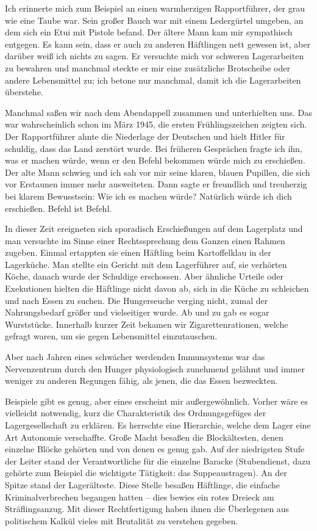 Ich erinnerte mich zum Beispiel an einen warmherzigen Rapportführer, der grau wie eine Taube war.  Sein großer Bauch war mit einem Ledergürtel umgeben, an dem sich ein Etui mit Pistole befand. Der ältere Mann kam mir sympathisch entgegen. Es kann sein, dass er auch zu anderen Häftlingen nett gewesen ist, aber darüber weiß ich nichts zu sagen. Er versuchte mich vor schweren Lagerarbeiten zu bewahren und manchmal steckte er mir eine zusätzliche Brotscheibe oder andere Lebensmittel zu; ich betone nur manchmal, damit ich die Lagerarbeiten überstehe.

Manchmal saßen wir nach dem Abendappell zusammen und unterhielten uns. 
Das war wahrscheinlich schon im März 1945, die ersten Frühlingszeichen zeigten sich. Der Rapportführer ahnte die Niederlage der Deutschen und hielt Hitler für schuldig, dass das Land zerstört wurde. Bei früheren Gesprächen fragte ich ihn, was er machen würde, wenn er den Befehl bekommen würde mich zu erschießen.
Der alte Mann schwieg und ich sah vor mir seine klaren, blauen Pupillen, die sich vor Erstaunen immer mehr ausweiteten. Dann sagte er freundlich und treuherzig bei klarem Bewusstsein: \glqq Wie ich es machen würde? Natürlich würde ich dich erschießen. Befehl ist Befehl.\grqq

In dieser Zeit ereigneten sich sporadisch Erschießungen auf dem Lagerplatz und man versuchte im Sinne einer Rechtssprechung dem Ganzen einen Rahmen zugeben. Einmal ertappten sie einen Häftling beim Kartoffelklau in der Lagerküche. Man stellte ein Gericht mit dem Lagerführer auf, sie verhörten Köche, danach wurde der Schuldige erschossen. Aber ähnliche Urteile oder Exekutionen hielten die Häftlinge nicht davon ab, sich in die Küche zu schleichen und nach Essen zu suchen. Die Hungerseuche verging nicht, zumal der Nahrungsbedarf größer und vielseitiger wurde. Ab und zu gab es sogar Wurststücke. Innerhalb kurzer Zeit bekamen wir Zigarettenrationen, welche gefragt waren, um sie gegen Lebensmittel einzutauschen.

Aber nach Jahren eines schwächer werdenden Immunsystems war das Nervenzentrum durch den Hunger physiologisch zunehmend gelähmt und immer weniger zu anderen Regungen fähig, als jenen, die das Essen bezweckten.
 
Beispiele gibt es genug, aber eines erscheint mir außergewöhnlich. Vorher wäre es vielleicht notwendig, kurz die Charakteristik des Ordnungsgefüges der Lagergesellschaft zu erklären. Es herrschte eine Hierarchie, welche dem Lager eine Art Autonomie verschaffte. Große Macht besaßen die Blockältesten, denen einzelne Blöcke gehörten und von denen es genug gab. Auf der niedrigsten Stufe der Leiter stand der Verantwortliche für die einzelne Baracke (Stubendienst, dazu gehörte zum Beispiel die wichtigste Tätigkeit: das Suppeaustragen). An der Spitze stand der Lagerälteste. Diese Stelle besaßen Häftlinge, die einfache Kriminalverbrechen begangen hatten -- dies bewies ein rotes Dreieck am Sträflingsanzug. Mit dieser Rechtfertigung haben ihnen die Überlegenen aus politischem Kalkül vieles mit Brutalität zu verstehen gegeben.

